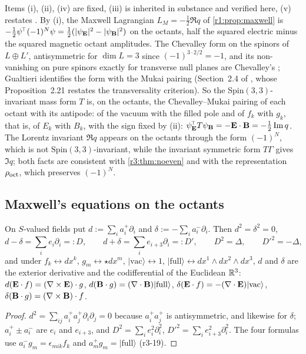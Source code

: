 Items (i), (ii), (iv) are fixed, (iii) is inherited in substance and verified here, (v) restates \cite{RE}. By (i), the Maxwell
Lagrangian $L_M=-\tfrac12\Re q$ of \cref{r1:prop:maxwell} is $-\tfrac12\psi^{\!\top}(-1)^N\psi=\tfrac12(|\psi_{\mathbf E}|^2-|\psi_{\mathbf B}|^2)$ on the octants, half the
squared electric minus the squared magnetic octant amplitudes. The Chevalley form on the spinors
of $L\oplus L'$, antisymmetric for $\dim L=3$ since $(-1)^{3\cdot2/2}=-1$, and its non-vanishing on pure spinors exactly for transverse null
planes are Chevalley's \cite{Chevalley54}; Gualtieri identifies the form with the Mukai pairing (Section~2.4 of \cite{Gualtieri03}, whose
Proposition~2.21 restates the transversality criterion). So the Spin$(3,3)$-invariant mass form $T$ is, on the octants, the Chevalley--Mukai pairing of each octant with its
antipode: of the vacuum with the filled pole and of $f_k$ with $g_k$, that is, of $E_k$ with $B_k$, with the sign fixed by (ii):
$\psi_{\mathbf E}^{\!\top}T\psi_{\mathbf B}=-\mathbf E\cdot\mathbf B=-\tfrac12\operatorname{Im} q$. The Lorentz invariant $\Re q$ appears on
the octants through the form $(-1)^N$, which is not $\mathrm{Spin}(3,3)$-invariant, while the invariant symmetric form $T\Gamma$ gives $\Im q$;
both facts are consistent with \cref{r3:thm:noeven} and with the representation $\rho_{\rm oct}$, which preserves $(-1)^N$.

\subsection{Maxwell's equations on the octants}
\label{r3:sec:maxwell}

\begin{proposition}
\label{r3:prop:dk}
On $S$-valued fields put $d:=\sum_ia^+_i\partial_i$ and $\delta:=-\sum_ia^-_i\partial_i$. Then $d^2=\delta^2=0$,
\[
d-\delta=\sum_ie_i\partial_i=:D,\qquad d+\delta=\sum_ie_{i+3}\partial_i=:D',\qquad D^2=\Delta,\qquad D'^2=-\Delta,
\]
and under $f_k\leftrightarrow dx^k$, $g_m\leftrightarrow\star dx^m$, $|\mathrm{vac}\rangle\leftrightarrow1$, $|\mathrm{full}\rangle\leftrightarrow dx^1\wedge dx^2\wedge dx^3$, $d$ and $\delta$
are the exterior derivative and the codifferential of the Euclidean $\mathbb{R}^3$: $d(\mathbf E\cdot f)=(\nabla\times\mathbf E)\cdot g$, $d(\mathbf B\cdot g)=(\nabla\cdot\mathbf B)|\mathrm{full}\rangle$,
$\delta(\mathbf E\cdot f)=-(\nabla\cdot\mathbf E)|\mathrm{vac}\rangle$, $\delta(\mathbf B\cdot g)=(\nabla\times\mathbf B)\cdot f$.
\end{proposition}

\begin{proof}
$d^2=\sum_{ij}a^+_ia^+_j\partial_i\partial_j=0$ because $a^+_ia^+_j$ is antisymmetric, and likewise for $\delta$; $a^+_i\pm a^-_i$ are $e_i$ and $e_{i+3}$, and
$D^2=\sum_ie_i^2\partial_i^2$, $D'^2=\sum_ie_{i+3}^2\partial_i^2$. The four formulas use $a^-_ig_m=\epsilon_{mik}f_k$ and $a^+_mg_m=|\mathrm{full}\rangle$ (r3-19).
\end{proof}

